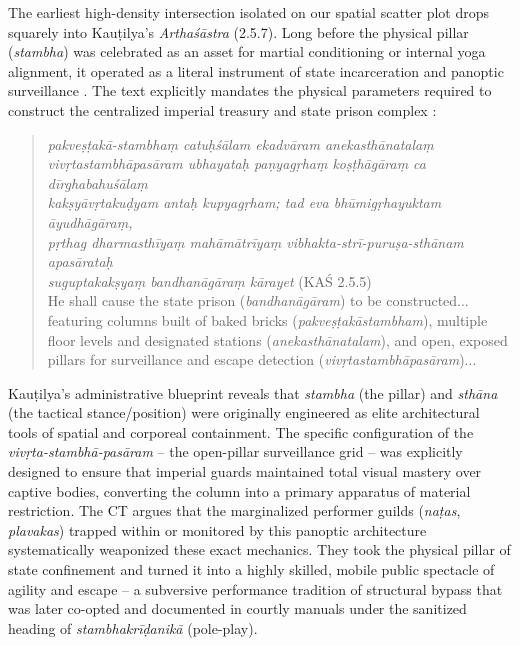 \documentclass[11pt,twoside,letterpaper]{article}
\begin{document}
The earliest high-density intersection isolated on our spatial scatter plot drops squarely into Kauṭilya’s \textit{Arthaśāstra} (2.5.7). Long before the physical pillar (\textit{stambha}) was celebrated as an asset for martial conditioning or internal yoga alignment, it operated as a literal instrument of state incarceration and panoptic surveillance \citep{Kangle1969}. The text explicitly mandates the physical parameters required to construct the centralized imperial treasury and state prison complex \citep{Kangle1969}:

\begin{quote}
\textit{pakveṣṭakā-stambhaṃ catuḥśālam ekadvāram anekasthānatalaṃ \\
vivṛtastambhāpasāram ubhayataḥ paṇyagṛhaṃ koṣṭhāgāraṃ ca dīrghabahuśālaṃ\\
kakṣyāvṛtakuḍyam antaḥ kupyagṛham; tad eva bhūmigṛhayuktam āyudhāgāraṃ,\\
pṛthag dharmasthīyaṃ mahāmātrīyaṃ vibhakta-strī-puruṣa-sthānam apasārataḥ\\
suguptakakṣyaṃ bandhanāgāraṃ kārayet} (KAŚ 2.5.5) \\
He shall cause the state prison (\textit{bandhanāgāram}) to be constructed...
featuring columns built of baked bricks (\textit{pakveṣṭakāstambham}),
multiple floor levels and designated stations (\textit{anekasthānatalam}), 
and open, exposed pillars for surveillance and escape detection (\textit{vivṛtastambhāpasāram})...
\end{quote}

Kauṭilya’s administrative blueprint reveals that \textit{stambha} (the pillar) and \textit{sthāna} (the tactical stance/position) were originally engineered as elite architectural tools of spatial and corporeal containment. The specific configuration of the \textit{vivṛta-stambhā-pasāram} – the open-pillar surveillance grid – was explicitly designed to ensure that imperial guards maintained total visual mastery over captive bodies, converting the column into a primary apparatus of material restriction. The CT argues that the marginalized performer guilds (\textit{naṭas}, \textit{plavakas}) trapped within or monitored by this panoptic architecture systematically weaponized these exact mechanics. They took the physical pillar of state confinement and turned it into a highly skilled, mobile public spectacle of agility and escape – a subversive performance tradition of structural bypass that was later co-opted and documented in courtly manuals under the sanitized heading of \textit{stambhakrīḍanikā} (pole-play).
\end{document}
